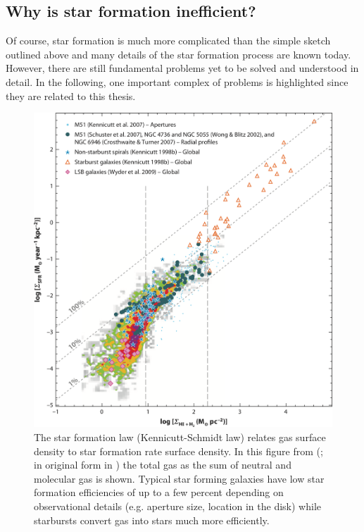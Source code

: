 \subsection{Why is star formation inefficient?}
\label{introduction: section: star formation: inefficiency}

Of course, star formation is much more complicated than the simple sketch outlined above and many details of the star formation process are known today. However, there are still fundamental problems yet to be solved and understood in detail.
In the following, one important complex of problems is highlighted since they are related to this thesis.

\begin{figure}[t]
	\centering
	\includegraphics[width=0.8\linewidth]{images/chapters/introduction/sf/SF_law.pdf}
	\caption[Star formation (Kennicutt-Schmidt) law]{The star formation law (Kennicutt-Schmidt law) relates gas surface density to star formation rate surface density. In this figure from (\citealt{2012ARA&A..50..531K}; in original form in \citealt{2008AJ....136.2846B}) the total gas as the sum of neutral and molecular gas is shown. Typical star forming galaxies have low star formation efficiencies of up to a few percent depending on observational details (e.g. aperture size, location in the disk) while starbursts convert gas into stars much more efficiently.}
	\label{introduction: figure: star formation: SF law}
\end{figure}

